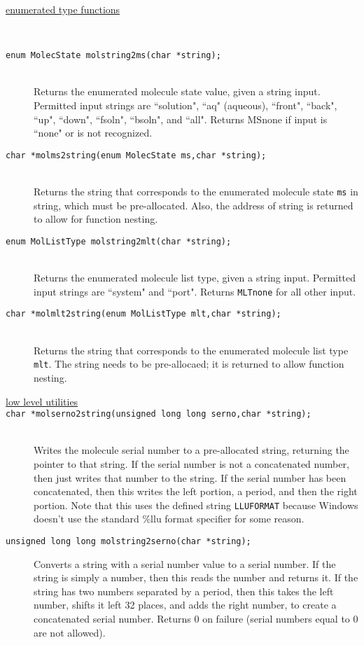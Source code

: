 \documentclass {scrbook}
\newcommand {\ttt} {\texttt}
\begin{document}
\begin{description}

\item[\underline{enumerated type functions}]
\hfill \\

\item[\ttt{enum MolecState molstring2ms(char *string);}]
\hfill \\
Returns the enumerated molecule state value, given a string input. Permitted input strings are ``solution", ``aq" (aqueous), ``front", ``back", ``up", ``down", ``fsoln", ``bsoln", and ``all". Returns MSnone if input is ``none" or is not recognized.

\item[\ttt{char *molms2string(enum MolecState ms,char *string);}]
\hfill \\
Returns the string that corresponds to the enumerated molecule state \ttt{ms} in string, which must be pre-allocated. Also, the address of string is returned to allow for function nesting.

\item[\ttt{enum MolListType molstring2mlt(char *string);}]
\hfill \\
Returns the enumerated molecule list type, given a string input. Permitted input strings are ``system" and ``port". Returns \ttt{MLTnone} for all other input.

\item[\ttt{char *molmlt2string(enum MolListType mlt,char *string);}]
\hfill \\
Returns the string that corresponds to the enumerated molecule list type \ttt{mlt}. The string needs to be pre-allocaed; it is returned to allow function nesting.

\item[\underline{low level utilities}]

\item[\ttt{char *molserno2string(unsigned long long serno,char *string);}]
\hfill \\
Writes the molecule serial number to a pre-allocated string, returning the pointer to that string. If the serial number is not a concatenated number, then just writes that number to the string. If the serial number has been concatenated, then this writes the left portion, a period, and then the right portion. Note that this uses the defined string \ttt{LLUFORMAT} because Windows doesn't use the standard \%llu format specifier for some reason.

\item[\ttt{unsigned long long molstring2serno(char *string);}]
\hfill
Converts a string with a serial number value to a serial number. If the string is simply a number, then this reads the number and returns it. If the string has two numbers separated by a period, then this takes the left number, shifts it left 32 places, and adds the right number, to create a concatenated serial number. Returns 0 on failure (serial numbers equal to 0 are not allowed).


\end{description}
\end{document}
